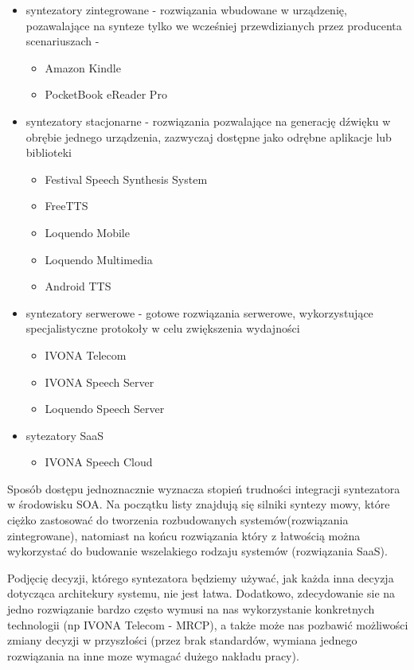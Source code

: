 \begin{itemize}
	\item syntezatory zintegrowane  - rozwiązania wbudowane w urządzenię, pozawalające na synteze tylko we wcześniej przewdizianych przez producenta scenariuszach - 
		\begin{itemize}
			\item  Amazon Kindle
			\item  PocketBook eReader Pro
		\end{itemize}
	\item syntezatory stacjonarne - rozwiązania pozwalające na generację dźwięku w obrębie jednego urządzenia, zazwyczaj dostępne jako odrębne aplikacje lub biblioteki
		\begin{itemize}
			\item Festival Speech Synthesis System
			\item FreeTTS
			\item Loquendo Mobile
			\item Loquendo Multimedia
			\item Android TTS
		\end{itemize}
	\item syntezatory serwerowe - gotowe rozwiązania serwerowe, wykorzystujące specjalistyczne protokoły w celu zwiększenia wydajności 
		\begin{itemize}
			\item IVONA Telecom
			\item IVONA Speech Server
			\item Loquendo Speech Server
		\end{itemize}
	\item sytezatory SaaS
		\begin{itemize}
			\item IVONA Speech Cloud
		\end{itemize}
\end{itemize}

Sposób dostępu jednoznacznie wyznacza stopień trudności integracji syntezatora w środowisku SOA. Na początku listy znajdują się silniki syntezy mowy, które ciężko zastosować do tworzenia rozbudowanych systemów(rozwiązania zintegrowane), natomiast na końcu rozwiązania który z łatwością można wykorzystać do budowanie wszelakiego rodzaju systemów (rozwiązania SaaS).

Podjęcię decyzji, którego syntezatora będziemy używać, jak każda inna decyzja dotycząca architekury systemu, nie jest łatwa. Dodatkowo, zdecydowanie sie na jedno rozwiązanie bardzo często wymusi na nas wykorzystanie konkretnych technologii (np IVONA Telecom - MRCP), a także może nas pozbawić możliwości zmiany decyzji w przyszłości (przez brak standardów, wymiana jednego rozwiązania na inne moze wymagać dużego nakładu pracy).

